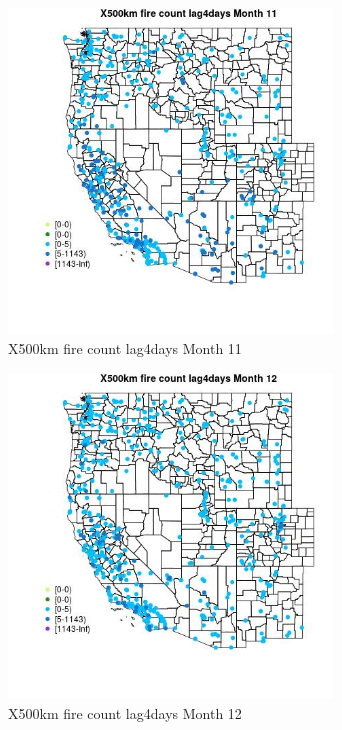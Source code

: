 \begin{figure} 
\centering  
\includegraphics[width=0.77\textwidth]{Code_Outputs/Report_ML_input_PM25_Step4_part_e_de_duplicated_aves_compiled_2019-05-14wNAs_MapObsMo11X500km_fire_count_lag4days.jpg} 
\caption{\label{fig:Report_ML_input_PM25_Step4_part_e_de_duplicated_aves_compiled_2019-05-14wNAsMapObsMo11X500km_fire_count_lag4days}X500km fire count lag4days Month 11} 
\end{figure} 
 

\begin{figure} 
\centering  
\includegraphics[width=0.77\textwidth]{Code_Outputs/Report_ML_input_PM25_Step4_part_e_de_duplicated_aves_compiled_2019-05-14wNAs_MapObsMo12X500km_fire_count_lag4days.jpg} 
\caption{\label{fig:Report_ML_input_PM25_Step4_part_e_de_duplicated_aves_compiled_2019-05-14wNAsMapObsMo12X500km_fire_count_lag4days}X500km fire count lag4days Month 12} 
\end{figure} 
 

